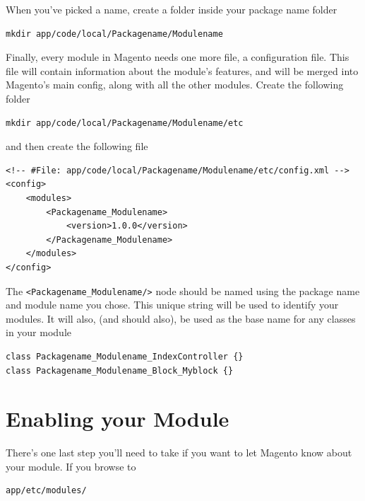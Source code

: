 \documentclass[oneside]{book}
\begin{document}
When you've picked a name, create a folder inside your package name folder

\begin{lstlisting}
mkdir app/code/local/Packagename/Modulename

\end{lstlisting}


Finally, every module in Magento needs one more file, a configuration file. This file will contain information about the module's features, and will be merged into Magento's main config, along with all the other modules.  Create the following folder 

\begin{lstlisting}
mkdir app/code/local/Packagename/Modulename/etc

\end{lstlisting}


and then create the following file

\begin{lstlisting}
<!-- #File: app/code/local/Packagename/Modulename/etc/config.xml -->
<config>
    <modules>
        <Packagename_Modulename>
            <version>1.0.0</version>
        </Packagename_Modulename>
    </modules>
</config>

\end{lstlisting}


The \footnotesize\texttt{\textless Packagename\_Modulename/\textgreater } \normalsize  node should be named using the package name and module name you chose.  This unique string will be used to identify your modules.  It will also, (and should also), be used as the base name for any classes in your module

\begin{lstlisting}
class Packagename_Modulename_IndexController {}
class Packagename_Modulename_Block_Myblock {}

\end{lstlisting}


\section{Enabling your Module}

There's one last step you'll need to take if you want to let Magento know about your module.  If you browse to

\begin{lstlisting}
app/etc/modules/

\end{lstlisting}
\end{document}
